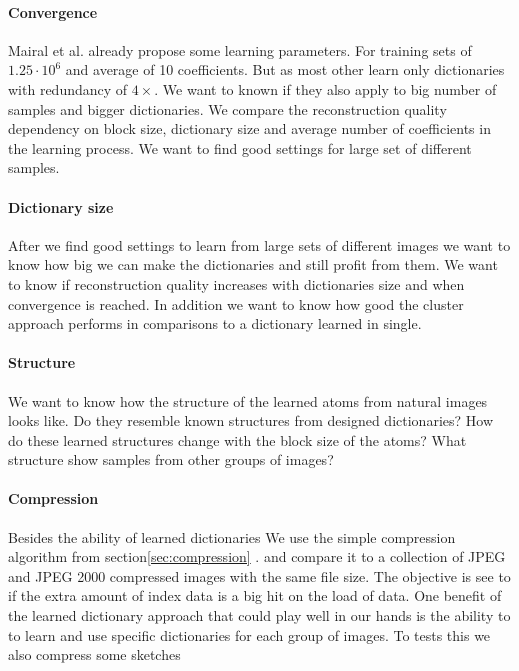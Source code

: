\paragraph{Convergence}
Mairal et al. already propose some learning parameters.
For training sets of $1.25\cdot 10^6$ and average of 10 coefficients.
But as most other learn only dictionaries with redundancy of $4\times$.
We want to known if they also apply to big number of samples and bigger
dictionaries.
We compare the reconstruction quality dependency on block size, dictionary
size and average number of coefficients in the learning process.
We want to find good settings for large set of different samples.

\paragraph{Dictionary size}
After we find good settings to learn from large sets of different images we
want to know how big we can make the dictionaries and still profit from them.
We want to know if reconstruction quality increases with dictionaries
size and when convergence is reached.
In addition we want to know how good the cluster approach performs in
comparisons to a dictionary learned in single.

\paragraph{Structure}
We want to know how the structure of the learned atoms from natural images looks
like. Do they resemble known structures from designed dictionaries? How do these
learned structures change with the block size of the atoms?
What structure show samples from other groups of images?

\paragraph{Compression}
Besides the ability of learned dictionaries 
We use the simple compression algorithm from section\ref{sec:compression} .
and compare it to a collection of JPEG and JPEG 2000 compressed images with the
same file size. 
The objective is see to if the extra amount of index data is a big hit on the
load of data.
One benefit of the learned dictionary approach that could play well in our
hands is the ability to to learn and use specific dictionaries for each group of
images. To tests this we also compress some sketches 


